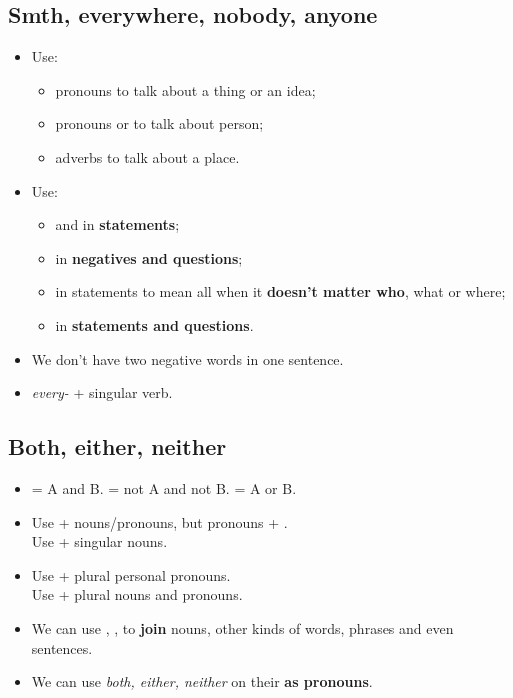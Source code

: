 \subsection{Smth, everywhere, nobody, anyone}
\begin{itemize}
    \item Use:
    \begin{itemize}
        \item pronouns  to talk about a thing or an idea;
        \item pronouns  or  to talk about person;
        \item adverbs  to talk about a place.
    \end{itemize}
    \item Use:
    \begin{itemize}
        \item {} and  in \textbf{statements};
        \item {} in \textbf{negatives and questions};
        \item {} in statements to mean all when it \textbf{doesn't matter who}, what or where;
        \item {} in \textbf{statements and questions}.
    \end{itemize}
    \item[\ast] We don't have two negative words in one sentence.
    \item[\ast] \textit{every-} + singular verb.
\end{itemize}

\subsection{Both, either, neither}
\begin{itemize}
    \item {} = A and B.  = not A and not B.  = A or B\@.
    \item Use  + nouns/pronouns, but pronouns + .\\
    Use  + singular nouns.
    \item Use  + plural personal pronouns.\\
    Use  + plural nouns and pronouns.
    \item We can use , , 
    to \textbf{join} nouns, other kinds of words, phrases and even sentences.
    \item We can use \textit{both, either, neither} on their  \textbf{as pronouns}.
\end{itemize}

